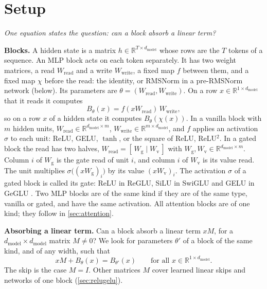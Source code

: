 \documentclass[10pt]{article}
\theoremstyle{definition}
\theoremstyle{remark}
\newcommand{\R}{\mathbb{R}}
\newcommand{\Wread}{W_{\mathrm{read}}}
\newcommand{\Wwrite}{W_{\mathrm{write}}}
\newcommand{\dm}{d_{\mathrm{model}}}
\newcommand{\para}[1]{\smallskip\noindent\textbf{#1}\hspace{0.5em}}
\newcommand{\takeaway}[1]{\noindent\textit{#1}\par\smallskip}
\begin{document}
\section{Setup}\label{sec:setup}
\takeaway{One equation states the question: can a block absorb a linear term?}

\para{Blocks.} A hidden state is a matrix $h \in \R^{T\times\dm}$ whose rows are the $T$ tokens of a sequence. An MLP block acts on each token separately. It has two weight matrices, a read $\Wread$ and a write $\Wwrite$, a fixed map $f$ between them, and a fixed map $\chi$ before the read: the identity, or RMSNorm in a pre-RMSNorm network (below). Its parameters are $\theta = (\Wread, \Wwrite)$. On a row $x \in \R^{1\times\dm}$ that it reads it computes
\begin{equation}\label{eq:mlp}
B_\theta(x) = f(x\Wread)\,\Wwrite,
\end{equation}
so on a row $x$ of a hidden state it computes $B_\theta(\chi(x))$.
In a vanilla block with $m$ hidden units, $\Wread \in \R^{\dm\times m}$, $\Wwrite \in \R^{m\times\dm}$, and $f$ applies an activation $\sigma$ to each unit: ReLU, GELU, $\tanh$, or the square of ReLU, ReLU$^2$. In a gated block the read has two halves, $\Wread = [\,W_{\mathrm g} \mid W_{\mathrm v}\,]$ with $W_{\mathrm g}, W_{\mathrm v} \in \R^{\dm\times m}$. Column $i$ of $W_{\mathrm g}$ is the gate read of unit $i$, and column $i$ of $W_{\mathrm v}$ is its value read. The unit multiplies $\sigma\big((xW_{\mathrm g})_i\big)$ by its value $(xW_{\mathrm v})_i$. The activation $\sigma$ of a gated block is called its gate: ReLU in ReGLU, SiLU in SwiGLU and GELU in GeGLU \citep{shazeer2020glu}. Two MLP blocks are of the same kind if they are of the same type, vanilla or gated, and have the same activation. All attention blocks are of one kind; they follow in \cref{sec:attention}.

\para{Absorbing a linear term.} Can a block absorb a linear term $xM$, for a $\dm\times\dm$ matrix $M \neq 0$? We look for parameters $\theta'$ of a block of the same kind, and of any width, such that
\begin{equation}\label{eq:absorbask}
xM + B_\theta(x) = B_{\theta'}(x) \qquad\text{for all } x \in \R^{1\times\dm}.
\end{equation}
The skip is the case $M = I$. Other matrices $M$ cover learned linear skips and networks of one block (\cref{sec:relugelu}).
\end{document}
